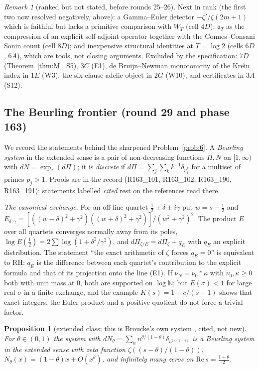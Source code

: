\documentclass[11pt]{amsart}
\newtheorem{proposition}[theorem]{Proposition}
\theoremstyle{definition}
\theoremstyle{remark}
\newtheorem{remark}[theorem]{Remark}
\newcommand{\N}{\mathbb N}
\newcommand{\Rel}{\mathrm{Re}\,}
\begin{document}
\begin{remark}[ranked but not stated, before rounds 25--26]
Next in rank (the first two now resolved negatively, above): a Gamma--Euler detector $-\zeta'/\zeta(2m+1)$ which is faithful but lacks a primitive
comparison with $W_T$ (cell $4D$); $\mathfrak a_T$ as the compression of an explicit self-adjoint operator
together with the Connes--Consani Sonin count (cell $8D$); and inexpensive structural identities at
$T=\log2$ (cells $6D$, $6A$), which are tools, not closing arguments. Excluded by the specification:
$7D$ (Theorem~\ref{thm:M}, S5), $3C$ (E1), de Bruijn--Newman monotonicity of the Kre\u{\i}n index in $1E$
(W3), the six-clause adelic object in $2G$ (W10), and certificates in $3A$ (S12).
\end{remark}

\subsection{The Beurling frontier (round 29 and phase 163)}\label{subsec:beurling}
We record the statements behind the sharpened Problem~\ref{prob:6}. A \emph{Beurling system} in the extended
sense is a pair of non-decreasing functions $\Pi,N$ on $[1,\infty)$ with $dN=\exp_*(d\Pi)$; it is \emph{discrete} if
$d\Pi=\sum_j\sum_k k^{-1}\delta_{p_j^k}$ for a multiset of primes $p_j>1$. Proofs are in the record (R163\_101,
R163\_102, R163\_190, R163\_191); statements labelled \emph{cited} rest on the references read there.

\emph{The canonical exchange.} For an off-line quartet $\frac12\pm\delta\pm i\gamma$ put $w=s-\frac12$ and
$E_{\delta,\gamma}=[((w-\delta)^2+\gamma^2)((w+\delta)^2+\gamma^2)]/(w^2+\gamma^2)^2$. The product $E$ over all quartets
converges normally away from its poles, $\log E(\frac12)=2\sum\log(1+\delta^2/\gamma^2)$, and
$d\Pi_{\zeta/E}=d\Pi_\zeta+q_E$ with $q_E$ an explicit distribution. The statement ``the exact arithmetic of $\zeta$
forces $q_E=0$'' is equivalent to RH: $q_E$ is the difference between each quartet's contribution to the explicit
formula and that of its projection onto the line (E1). If $\nu_N=\nu_0*\kappa$ with $\nu_0,\kappa\ge0$ both with
unit mass at $0$, both are supported on $\log\N$; but $E(\sigma)<1$ for large real $\sigma$ in a finite exchange, and
the example $K(s)=1-c/(s+1)$ shows that exact integers, the Euler product and a positive quotient do not force a
trivial factor.

\begin{proposition}[extended class; this is Broucke's own system \cite{Broucke2024}, cited, not new]\label{prop:zetatheta}
For $\theta\in(0,1)$ the system with $dN_\theta=\sum_nn^{\theta/(1-\theta)}\delta_{n^{1/(1-\theta)}}$ is a Beurling
system in the extended sense with zeta function $\zeta((s-\theta)/(1-\theta))$, $N_\theta(x)=(1-\theta)x+O(x^\theta)$, and
infinitely many zeros on $\Rel s=\frac{1+\theta}2$.
\end{proposition}
\end{document}
